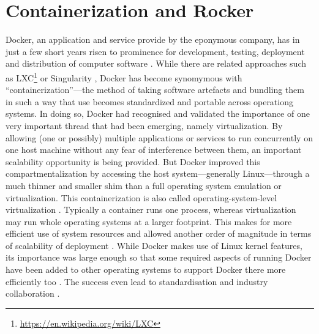 \hypertarget{containerization-and-rocker}{%
\section{Containerization and
Rocker}\label{containerization-and-rocker}}

\label{containerisation} \label{rocker}

Docker, an application and service provide by the eponymous company, has
in just a few short years risen to prominence for development, testing,
deployment and distribution of computer software
\citep[cf.][]{datadog_8_2018,munoz_history_2019}. While there are
related approaches such as
LXC\footnote{\href{https://en.wikipedia.org/wiki/LXC}{https://en.wikipedia.org/wiki/LXC}}
or Singularity \citep{kurtzer_singularity_2017}, Docker has become
synomymous with ``containerization''---the method of taking software
artefacts and bundling them in such a way that use becomes standardized
and portable across operationg systems. In doing so, Docker had
recognised and validated the importance of one very important thread
that had been emerging, namely virtualization. By allowing (one or
possibly) multiple applications or services to run concurrently on one
host machine without any fear of interference between them, an important
scalability opportunity is being provided. But Docker improved this
compartmentalization by accessing the host system---generally
Linux---through a much thinner and smaller shim than a full operating
system emulation or virtualization. This containerization is also called
operating-system-level virtualization
\citep{wikipedia_contributors_os-level_2020}. Typically a container runs
one process, whereas virtualization may run whole operating systems at a
larger footprint. This makes for more efficient use of system resources
\citep{felter_updated_2015} and allowed another order of magnitude in
terms of scalability of deployment \citep[cf.][]{datadog_8_2018}. While
Docker makes use of Linux kernel features, its importance was large
enough so that some required aspects of running Docker have been added
to other operating systems to support Docker there more efficiently too
\citep{microsoft_linux_2019}. The success even lead to standardisation
and industry collaboration \citep{oci_open_2019}.

